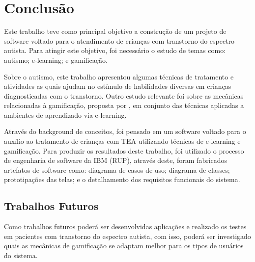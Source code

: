 \chapter{Conclusão}\label{cap:conclusao}
Este trabalho teve como principal objetivo a construção de um projeto de software voltado para o atendimento de crianças com transtorno do espectro autista. Para atingir este objetivo, foi necessário o estudo de temas como: autismo; e-learning; e gamificação.

Sobre o autismo, este trabalho apresentou algumas técnicas de tratamento e atividades as quais ajudam no estímulo de habilidades diversas em crianças diagnosticadas com o transtorno. Outro estudo relevante foi sobre as mecânicas relacionadas à gamificação, proposta por \cite{zichermann2011gamification}, em conjunto das técnicas aplicadas a ambientes de aprendizado via e-learning.

Através do background de conceitos, foi pensado em um software voltado para o auxílio ao tratamento de crianças com TEA utilizando técnicas de e-learning e gamificação. Para produzir os resultados deste trabalho, foi utilizado o processo de engenharia de software da IBM (RUP), através deste, foram fabricados artefatos de software como: diagrama de casos de uso; diagrama de classes; prototipações das telas; e o detalhamento dos requisitos funcionais do sistema.


\section{Trabalhos Futuros}
Como trabalhos futuros poderá ser desenvolvidas aplicações e realizado os testes em pacientes com transtorno do espectro autista, com isso, poderá ser investigado quais as mecânicas de gamificação se adaptam melhor para os tipos de usuários do sistema. 
